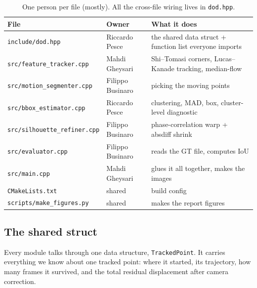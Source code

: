 \documentclass[11pt,a4paper]{article}
\begin{document}
\begin{table}[H]\centering\small
\begin{tabular}{llp{7.0cm}}
\toprule
File & Owner & What it does \\
\midrule
\texttt{include/dod.hpp}           & Riccardo Pesce    & the shared data struct + function list everyone imports \\
\texttt{src/feature\_tracker.cpp}  & Mahdi Gheysari    & Shi--Tomasi corners, Lucas--Kanade tracking, median-flow \\
\texttt{src/motion\_segmenter.cpp} & Filippo Businaro  & picking the moving points \\
\texttt{src/bbox\_estimator.cpp}   & Riccardo Pesce    & clustering, MAD, box, cluster-level diagnostic \\
\texttt{src/silhouette\_refiner.cpp} & Filippo Businaro  & phase-correlation warp + absdiff shrink \\
\texttt{src/evaluator.cpp}         & Filippo Businaro  & reads the GT file, computes IoU \\
\texttt{src/main.cpp}              & Mahdi Gheysari    & glues it all together, makes the images \\
\texttt{CMakeLists.txt}            & shared            & build config \\
\texttt{scripts/make\_figures.py}  & shared            & makes the report figures \\
\bottomrule
\end{tabular}
\caption{One person per file (mostly). All the cross-file wiring
lives in \texttt{dod.hpp}.}
\end{table}

\subsection{The shared struct}

Every module talks through one data structure, \texttt{TrackedPoint}.
It carries everything we know about one tracked point: where it
started, its trajectory, how many frames it survived, and the total
residual displacement after camera correction.
\end{document}
